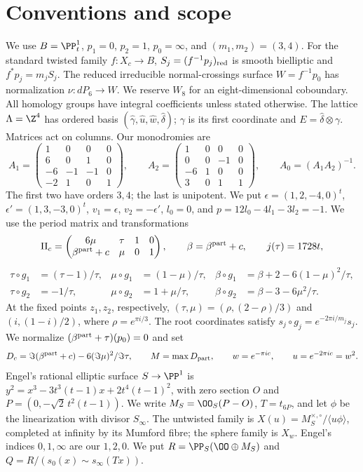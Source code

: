 \section*{Conventions and scope}
We use $B=\PP^1_t$, $p_1=0$, $p_2=1$, $p_0=\infty$, and
$(m_1,m_2)=(3,4)$. For the standard twisted family $f:X_c\to B$,
$S_j=(f^{-1}p_j)_{\rm red}$ is smooth bielliptic and
$f^*p_j=m_jS_j$. The reduced irreducible normal-crossings surface
$W=f^{-1}p_0$ has normalization $\nu:dP_6\to W$. We reserve $W_8$
for an eight-dimensional coboundary. All homology groups have integral
coefficients unless stated otherwise. The lattice $\Lambda=\Z^4$ has
ordered basis $(\widehat\gamma,\widehat u,\widehat w,\widehat\delta)$;
$\gamma$ is its first coordinate and $E=\widehat\delta\otimes\gamma$.
Matrices act on columns. Our monodromies are
\[
 A_1=\begin{pmatrix}1&0&0&0\\6&0&1&0\\-6&-1&-1&0\\-2&1&0&1\end{pmatrix},\qquad
 A_2=\begin{pmatrix}1&0&0&0\\0&0&-1&0\\-6&1&0&0\\3&0&1&1\end{pmatrix},\qquad
 A_0=(A_1A_2)^{-1}.
\]
The first two have orders $3,4$; the last is unipotent. We put
$\epsilon=(1,2,-4,0)^t$, $\epsilon'=(1,3,-3,0)^t$,
$v_1=\epsilon$, $v_2=-\epsilon'$, $l_0=0$, and
$p=12l_0-4l_1-3l_2=-1$. We use the period matrix and transformations
\[
 \Pi_c=\begin{pmatrix}6\mu&\tau&1&0\\\beta^{\rm part}+c&\mu&0&1\end{pmatrix},
 \qquad \beta=\beta^{\rm part}+c,\qquad j(\tau)=1728t,
\]
\[
\begin{aligned}
 \tau\circ g_1&=(\tau-1)/\tau,&
 \mu\circ g_1&=(1-\mu)/\tau,&
 \beta\circ g_1&=\beta+2-6(1-\mu)^2/\tau,\\
 \tau\circ g_2&=-1/\tau,&
 \mu\circ g_2&=1+\mu/\tau,&
 \beta\circ g_2&=\beta-3-6\mu^2/\tau.
\end{aligned}
\]
At the fixed points $z_1,z_2$, respectively,
$(\tau,\mu)=(\rho,(2-\rho)/3)$ and $(i,(1-i)/2)$, where
$\rho=e^{\pi i/3}$. The root coordinates satisfy
$s_j\circ g_j=e^{-2\pi i/m_j}s_j$. We normalize
$(\beta^{\rm part}+\tau)(p_0)=0$ and set
\[
 D_c=\Im(\beta^{\rm part}+c)-6(\Im\mu)^2/\Im\tau,\qquad
 M=\max D_{\rm part},\qquad w=e^{-\pi i c},\qquad u=e^{-2\pi i c}=w^2.
\]
Engel's rational elliptic surface $S\to\PP^1$ is
$y^2=x^3-3t^3(t-1)x+2t^4(t-1)^2$, with zero section $O$ and
$P=(0,-\sqrt2\,t^2(t-1))$. We write $M_S=\OO_S(P-O)$,
$T=t_{6P}$, and let $\phi$ be the linearization with divisor $S_\infty$.
The untwisted family is
$X(u)=M_S^{\times,\circ}/\langle u\phi\rangle$, completed at infinity
by its Mumford fibre; the sphere family is $X_w$. Engel's indices
$0,1,\infty$ are our $1,2,0$. We put
$R=\PP_S(\OO\oplus M_S)$ and
$Q=R/(s_0(x)\sim s_\infty(Tx))$.

